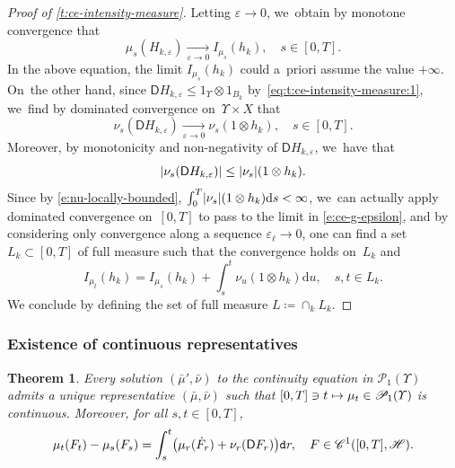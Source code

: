 \documentclass[10pt]{amsart}
\newcommand\mto{\mathchoice{\longmapsto}{\mapsto}{\mapsto}{\mapsto}}
\newtheorem{theorem}{Theorem}[section]
\theoremstyle{definition}
\theoremstyle{remark}
\DeclarePairedDelimiter{\paren}{\lparen}{\rparen}
\DeclarePairedDelimiter{\abs}{\lvert}{\rvert}
\let\Subsubsection\subsubsection
\begin{document}
\begin{proof}[Proof of \cref{t:ce-intensity-measure}]
Letting $\varepsilon \to 0$, we~obtain by monotone convergence that
\begin{equation*}
\mu_{s}(H_{k,\varepsilon}) \xrightarrow[\varepsilon \to 0]{} I_{\mu_{s}}(h_{k}), \quad s \in [0,T].
\end{equation*}
In the above equation, the limit $I_{\mu_{s}}(h_{k})$ could a~priori assume the value $+\infty$.
On~the other hand, since $\mathsf{D} H_{k,\varepsilon} \leq 1_{\varUpsilon} \otimes 1_{B_k}$ by~\cref{eq:t:ce-intensity-measure:1}, we~find by dominated convergence on~$\varUpsilon\times X$ that
\begin{equation}\label{e:dct-nu}
\nu_{s}(\mathsf{D} H_{k,\varepsilon}) \xrightarrow[\varepsilon \to 0]{} \nu_{s}(1 \otimes h_{k}), \quad s\in [0,T].
\end{equation}
Moreover, by monotonicity and non-negativity of $\mathsf{D}H_{k,\varepsilon}$, we~have that
\begin{equation*}
\abs{\nu_{s}(\mathsf{D} H_{k,\varepsilon})} \leq \abs{\nu_{s}}(1 \otimes h_{k}).
\end{equation*}
Since by \cref{e:nu-locally-bounded}, $\int_{0}^{T} \abs{\nu_{s}}(1 \otimes h_{k}) \mathrm{d} s < \infty$, we~can actually apply dominated convergence on~$[0,T]$ to pass to the limit in \cref{e:ce-g-epsilon}, and by considering only convergence along a sequence $\varepsilon_{\ell} \to 0$, one can find a set $L_{k} \subset [0,T]$ of full measure such that the convergence holds on~$L_k$ and
\begin{equation*}
I_{\mu_{t}}(h_{k}) = I_{\mu_{s}}(h_{k}) + \int_{s}^{t} \nu_{u}(1 \otimes h_{k}) \mathrm{d} u, \quad s,t \in L_{k}.
\end{equation*}
We conclude by defining the set of full measure $L \coloneq \cap_{k} L_{k}$.
\end{proof}

\Subsubsection{Existence of continuous representatives}

\begin{theorem}\label{t:ce-continuous-representative}
Every solution $(\bar{\mu}', \bar{\nu})$ to the continuity equation in $\mathscr{P}_{1}(\varUpsilon)$ admits a unique representative $(\bar{\mu}, \bar{\nu})$ such that $[0,T] \ni t \mto \mu_{t} \in \mathscr{P}_{1}(\varUpsilon)$ is continuous.
Moreover, for all $s,t \in [0,T]$,
\begin{equation}
\label{e:ce-integral-representation}
\mu_{t}(F_{t}) - \mu_{s}(F_{s}) = \int_{s}^{t} \paren[\big]{\mu_{r}(\dot{F}_{r}) + \nu_{r}(\mathsf{D} F_{r})} \mathtt{d} r, \quad F \in \mathscr{C}^{1}([0,T], \mathscr{H}).
\end{equation}
\end{theorem}
\end{document}
